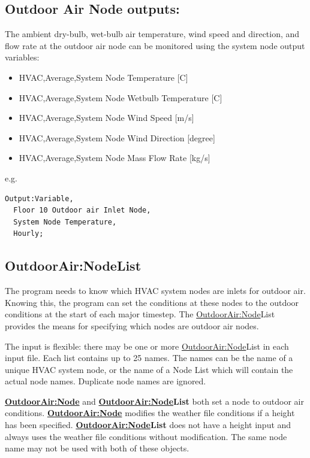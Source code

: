 \subsection{Outdoor Air Node outputs:}\label{outdoor-air-node-outputs}

The ambient dry-bulb, wet-bulb air temperature, wind speed and direction, and flow rate at the outdoor air node can be monitored using the system node output variables:

\begin{itemize}
\item
  HVAC,Average,System Node Temperature {[}C{]}
\item
  HVAC,Average,System Node Wetbulb Temperature {[}C{]}
\item
  HVAC,Average,System Node Wind Speed {[}m/s{]}
\item
  HVAC,Average,System Node Wind Direction {[}degree{]}
\item
  HVAC,Average,System Node Mass Flow Rate {[}kg/s{]}
\end{itemize}

e.g.

\begin{lstlisting}
Output:Variable,
  Floor 10 Outdoor air Inlet Node,
  System Node Temperature,
  Hourly;
\end{lstlisting}


\subsection{OutdoorAir:NodeList}\label{outdoorairnodelist}

The program needs to know which HVAC system nodes are inlets for outdoor air. Knowing this, the program can set the conditions at these nodes to the outdoor conditions at the start of each major timestep. The \hyperref[outdoorairnode]{OutdoorAir:Node}List provides the means for specifying which nodes are outdoor air nodes.

The input is flexible: there may be one or more \hyperref[outdoorairnode]{OutdoorAir:Node}List in each input file. Each list contains up to 25 names. The names can be the name of a unique HVAC system node, or the name of a Node List which will contain the actual node names. Duplicate node names are ignored.

\textbf{\hyperref[outdoorairnode]{OutdoorAir:Node}} and \textbf{\hyperref[outdoorairnode]{OutdoorAir:Node}List} both set a node to outdoor air conditions. \textbf{\hyperref[outdoorairnode]{OutdoorAir:Node}} modifies the weather file conditions if a height has been specified. \textbf{\hyperref[outdoorairnode]{OutdoorAir:Node}List} does not have a height input and always uses the weather file conditions without modification. The same node name may not be used with both of these objects.

